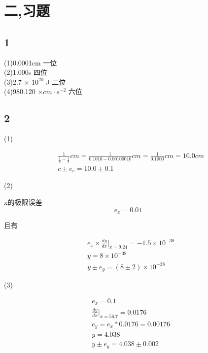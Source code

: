 \documentclass[a4paper,10pt,notitlepage]{report}
\begin{document}
\section*{二,习题}
\subsection*{1}
	
	(1)0.0001cm 一位 \\
	
	(2)1.000s 四位 \\
	
	(3)2.7 $\times$ $10^{20}$ J 二位 \\
	
	(4)980.120 $\times cm \cdot s^{-2}$ 六位 \\

\subsection*{2}

	(1)

\begin{align}
	&\frac{1}{\frac{1}{a} - \frac{1}{b}} cm = \frac{1}{0.10 \underline{10} - 0.001000 \underline{10}} cm = \frac{1}{0.10\underline{00}} cm = 10.0 cm  \\
	&c \pm e_c = 10.0 \pm 0.1
\end{align}

	(2)

	x的极限误差 \\
	
\begin{equation}
	e_x = 0.01
\end{equation}

	且有

\begin{align}
	&e_x \times \frac{dy}{dx} | _{x = 9.24} = -1.5 \times 10^{-38} \\
	&y = 8 \times 10^{-38} \\
	&y \pm e_y = ( 8 \pm 2) \times 10^{-38}
\end{align}
	
	(3)

\begin{align}
	&e_x = 0.1 \\
	&\frac{dy}{dx} | _{x = 56.7} = 0.0176 \\
	&e_y = e_x * 0.0176 = 0.00176 \\
	&y = 4.038 \\
	&y \pm e_y = 4.038 \pm 0.002
\end{align}
\end{document}

